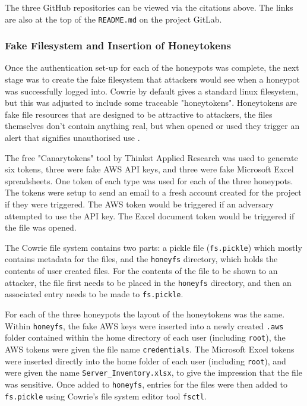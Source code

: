 \documentclass[]{article}
\begin{document}
The three GitHub repositories can be viewed via the citations above. The links are also at the top of the \texttt{README.md} on the project GitLab.

\subsubsection{Fake Filesystem and Insertion of Honeytokens}

Once the authentication set-up for each of the honeypots was complete, the next stage was to create the fake filesystem that attackers would see when a honeypot was successfully logged into. Cowrie by default gives a standard linux filesystem, but this was adjusted to include some traceable "honeytokens". Honeytokens are fake file resources that are designed to be attractive to attackers, the files themselves don't contain anything real, but when opened or used they trigger an alert that signifies unauthorised use \cite{honeytokens}.

The free "Canarytokens" tool by Thinkst Applied Research \cite{canarytokens} was used to generate six tokens, three were fake AWS API keys, and three were fake Microsoft Excel spreadsheets. One token of each type was used for each of the three honeypots. The tokens were setup to send an email to a fresh account created for the project if they were triggered. The AWS token would be triggered if an adversary attempted to use the API key. The Excel document token would be triggered if the file was opened.

The Cowrie file system contains two parts: a pickle file (\texttt{fs.pickle}) which mostly contains metadata for the files, and the \texttt{honeyfs} directory, which holds the contents of user created files. For the contents of the file to be shown to an attacker, the file first needs to be placed in the \texttt{honeyfs} directory, and then an associated entry needs to be made to \texttt{fs.pickle}. 

For each of the three honeypots the layout of the honeytokens was the same. Within \texttt{honeyfs}, the fake AWS keys were inserted into a newly created \texttt{.aws} folder contained within the home directory of each user (including \texttt{root}), the AWS tokens were given the file name \texttt{credentials}. The Microsoft Excel tokens were inserted directly into the home folder of each user (including \texttt{root}), and were given the name \texttt{Server\_Inventory.xlsx}, to give the impression that the file was sensitive. Once added to \texttt{honeyfs}, entries for the files were then added to \texttt{fs.pickle} using Cowrie's file system editor tool \texttt{fsctl}.
\end{document}

